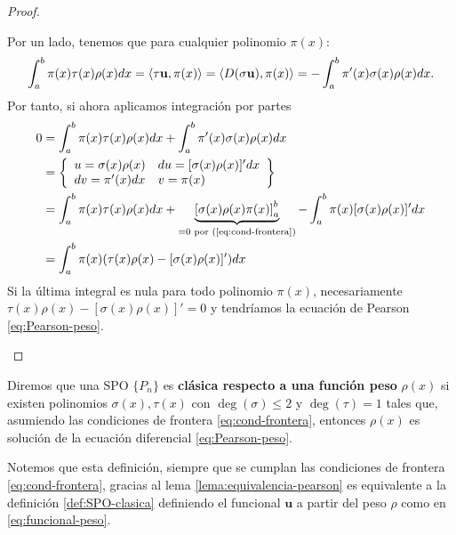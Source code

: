 \begin{proof}
\begin{itemize}
        Por un lado, tenemos que para cualquier polinomio $\pi(x)$:
        $$
        \int_a^b \pi(x)\tau(x)\rho(x)dx = \left\langle \tau \mathbf{u} , \pi(x) \right\rangle= \left\langle D(\sigma \mathbf{u}) , \pi(x) \right\rangle = -\int_a^b \pi'(x) \sigma(x)\rho(x) dx.
        $$
        Por tanto, si ahora aplicamos integración por partes
        \begin{equation*}
            \begin{split}
                0 &= \int_a^b \pi(x)\tau(x)\rho(x)dx + \int_a^b \pi'(x) \sigma(x)\rho(x) dx \\
                &= \left\{\begin{array}{ll}
                    u = \sigma(x)\rho(x) & du=[\sigma(x)\rho(x)]'dx \\
                    dv = \pi'(x) dx & v = \pi(x)
                \end{array}\right\} \\
                &= \int_a^b \pi(x)\tau(x)\rho(x)dx + \underbrace{\left[\sigma(x)\rho(x)\pi(x)\right]_a^b}_{=0\text{ por (\ref{eq:cond-frontera})}} - \int_a^b \pi(x)[\sigma(x)\rho(x)]'dx \\
                &= \int_a^b \pi(x)(\tau(x)\rho(x) - [\sigma(x)\rho(x)]' )dx
            \end{split}
        \end{equation*}
        Si la última integral es nula para todo polinomio $\pi(x)$, necesariamente \linebreak$\tau(x)\rho(x) -[\sigma(x)\rho(x)]' =0$ y tendríamos la ecuación de Pearson \eqref{eq:Pearson-peso}.
    \end{itemize}
    
    
\end{proof}

\begin{definicion}
    Diremos que una SPO $\{P_n\}$ es \textbf{clásica respecto a una función peso} $\rho(x)$ si existen polinomios $\sigma(x),\tau(x)$ con $\deg(\sigma)\leq 2$ y $\deg(\tau)=1$ tales que, asumiendo las condiciones de frontera \eqref{eq:cond-frontera}, entonces $\rho(x)$ es solución de la ecuación diferencial \eqref{eq:Pearson-peso}.
\end{definicion}

Notemos que esta definición, siempre que se cumplan las condiciones de frontera \eqref{eq:cond-frontera}, gracias al lema \ref{lema:equivalencia-pearson}    es equivalente a la definición \ref{def:SPO-clasica} definiendo el funcional $\mathbf{u}$ a partir del peso $\rho$ como en \eqref{eq:funcional-peso}.


